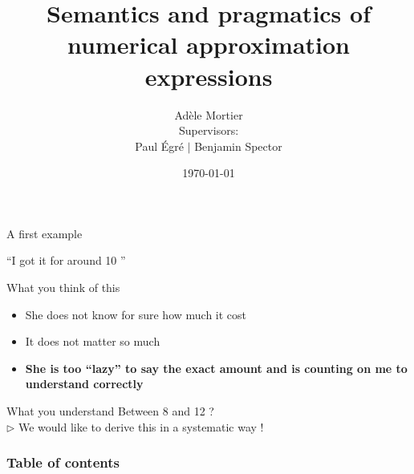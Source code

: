 \documentclass[xcolor=table, hyperref={pdfpagelabels=false}]{beamer}
\title{Semantics and pragmatics of numerical approximation expressions}
\author[a]{Adèle Mortier\\[10mm]{\small Supervisors:\\ Paul Égré $|$ Benjamin Spector}}
\date{\today}
\begin{document}
\begin{frame}
\titlepage

\end{frame} 






\begin{frame}{A first example}
\begin{center}
	\huge ``I got it for around 10 \EUR''
\end{center}\pause
\begin{block}{What you think of this}
	\begin{itemize}
		\item She does not know for sure how much it cost\pause
		\item It does not matter so much\pause
		\item \textbf{She is too ``lazy'' to say the exact amount and is counting on me to understand correctly}
	\end{itemize}
\end{block}\pause
\begin{block}{What you understand}
	Between 8 and 12 \EUR?\\
	$\triangleright$ We would like to derive this in a systematic way !
\end{block}
\end{frame}
\begin{frame}
\frametitle{Table of contents}
\tableofcontents
\end{frame} 
\end{document}
